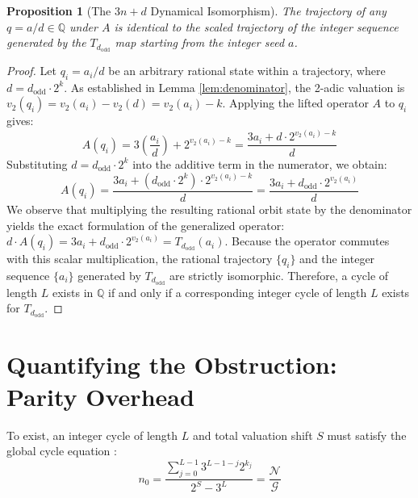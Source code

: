 \documentclass[11pt, a4paper]{article}
\newtheorem{proposition}[theorem]{Proposition}
\theoremstyle{definition}
\begin{document}
\begin{proposition}[The \texorpdfstring{$3n+d$}{3n+d} Dynamical Isomorphism]
\label{thm:general_iso}
The trajectory of any $q = a/d \in \mathbb{Q}$ under $A$ is identical to the scaled trajectory of the integer sequence generated by the $T_{d_{\text{odd}}}$ map starting from the integer seed $a$.
\end{proposition}

\begin{proof}
Let $q_i = a_i/d$ be an arbitrary rational state within a trajectory, where $d = d_{\text{odd}} \cdot 2^k$. As established in Lemma \ref{lem:denominator}, the 2-adic valuation is $v_2(q_i) = v_2(a_i) - v_2(d) = v_2(a_i) - k$. Applying the lifted operator $A$ to $q_i$ gives:
\begin{equation*}
A(q_i) = 3\left(\frac{a_i}{d}\right) + 2^{v_2(a_i)-k} = \frac{3a_i + d \cdot 2^{v_2(a_i)-k}}{d}
\end{equation*}
Substituting $d = d_{\text{odd}} \cdot 2^k$ into the additive term in the numerator, we obtain:
\begin{equation*}
A(q_i) = \frac{3a_i + (d_{\text{odd}} \cdot 2^k) \cdot 2^{v_2(a_i)-k}}{d} = \frac{3a_i + d_{\text{odd}} \cdot 2^{v_2(a_i)}}{d}
\end{equation*}
We observe that multiplying the resulting rational orbit state by the denominator yields the exact formulation of the generalized operator: $d \cdot A(q_i) = 3a_i + d_{\text{odd}} \cdot 2^{v_2(a_i)} = T_{d_{\text{odd}}}(a_i)$. Because the operator commutes with this scalar multiplication, the rational trajectory $\{q_i\}$ and the integer sequence $\{a_i\}$ generated by $T_{d_{\text{odd}}}$ are strictly isomorphic. Therefore, a cycle of length $L$ exists in $\mathbb{Q}$ if and only if a corresponding integer cycle of length $L$ exists for $T_{d_{\text{odd}}}$.
\end{proof}

\section{Quantifying the Obstruction: Parity Overhead}

To exist, an integer cycle of length $L$ and total valuation shift $S$ must satisfy the global cycle equation \cite{Steiner1977}:
\begin{equation}
\label{eq:cycle_raw}
n_0 = \frac{\sum_{j=0}^{L-1} 3^{L-1-j} 2^{k_j}}{2^S - 3^L} = \frac{\mathcal{N}}{\mathcal{G}}
\end{equation}
\end{document}
